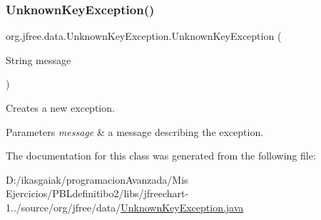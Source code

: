 \subsubsection{\texorpdfstring{Unknown\+Key\+Exception()}{UnknownKeyException()}}
{\footnotesize\ttfamily org.\+jfree.\+data.\+Unknown\+Key\+Exception.\+Unknown\+Key\+Exception (\begin{DoxyParamCaption}\item[{String}]{message }\end{DoxyParamCaption})}

Creates a new exception.


\begin{DoxyParams}{Parameters}
{\em message} & a message describing the exception. \\
\hline
\end{DoxyParams}


The documentation for this class was generated from the following file\+:\begin{DoxyCompactItemize}
\item 
D\+:/ikasgaiak/programacion\+Avanzada/\+Mis Ejercicios/\+P\+B\+Ldefinitibo2/libs/jfreechart-\/1../source/org/jfree/data/\mbox{\hyperlink{_unknown_key_exception_8java}{Unknown\+Key\+Exception.\+java}}\end{DoxyCompactItemize}
